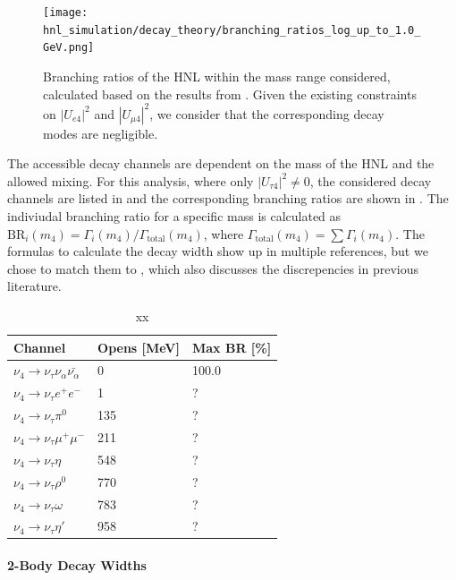 \begin{figure}
    \texttt{[image: hnl\_simulation/decay\_theory/branching\_ratios\_log\_up\_to\_1.0\_GeV.png]}
    \caption{Branching ratios of the HNL within the mass range considered, calculated based on the results from \cite{Coloma:2020lgy}. Given the existing constraints on $|U_{e4}|^{2}$ and $|U_{\mu4}|^{2}$, we consider that the corresponding decay modes are negligible.}
\end{figure}

The accessible decay channels are dependent on the mass of the HNL and the allowed mixing. For this analysis, where only $|U_{\tau4}|^2 \neq 0$, the considered decay channels are listed in  and the corresponding branching ratios are shown in . The indiviudal branching ratio for a specific mass is calculated as $\mathrm{BR}_i(m_4)=\Gamma_i(m_4)/\Gamma_\mathrm{total}(m_4)$, where $\Gamma_\mathrm{total}(m_4)=\sum\Gamma_i(m_4)$. The formulas to calculate the decay width show up in multiple references, but we chose to match them to , which also discusses the discrepencies in previous literature.

\begin{table}
    \centering
    \begin{tabular} { l || l | l}
        Channel & Opens [\si{\MeV}] & Max BR [\%] \\
        \hline \hline 
        $\nu_4 \rightarrow \nu_\tau \nu_\alpha \bar{\nu_\alpha}$ & 0 & 100.0 \\
        $\nu_4 \rightarrow \nu_\tau e^+ e^-$ & 1 & ? \\
        $\nu_4 \rightarrow \nu_\tau \pi^0$ & 135 & ? \\
        $\nu_4 \rightarrow \nu_\tau \mu^+ \mu^-$ & 211 & ? \\
        $\nu_4 \rightarrow \nu_\tau \eta$ & 548 & ? \\
        $\nu_4 \rightarrow \nu_\tau \rho^0$ & 770 & ? \\
        $\nu_4 \rightarrow \nu_\tau \omega$ & 783 & ? \\
        $\nu_4 \rightarrow \nu_\tau \eta'$ & 958 & ? \\
    \end{tabular}
    \caption{xx}
\end{table}


\paragraph{2-Body Decay Widths}

